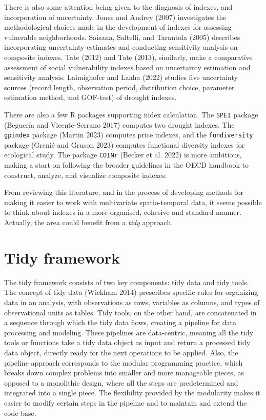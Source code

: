 \documentclass[
]{interact}
\begin{document}
There is also some attention being given to the diagnosis of indexes,
and incorporation of uncertainty. Jones and Andrey (2007) investigates
the methodological choices made in the development of indexes for
assessing vulnerable neighborhoods. Saisana, Saltelli, and Tarantola
(2005) describes incorporating uncertainty estimates and conducting
sensitivity analysis on composite indexes. Tate (2012) and Tate (2013),
similarly, make a comparative assessment of social vulnerability indexes
based on uncertainty estimation and sensitivity analysis. Laimighofer
and Laaha (2022) studies five uncertainty sources (record length,
observation period, distribution choice, parameter estimation method,
and GOF-test) of drought indexes.

There are also a few R packages supporting index calculation. The
\texttt{SPEI} package (Beguería and Vicente-Serrano 2017) computes two
drought indexes. The \texttt{gpindex} package (Martin 2023) computes
price indexes, and the \texttt{fundiversity} package (Grenié and Gruson
2023) computes functional diversity indexes for ecological study. The
package \texttt{COINr} (Becker et al. 2022) is more ambitious, making a
start on following the broader guidelines in the OECD handbook to
construct, analyze, and visualize composite indexes.

From reviewing this literature, and in the process of developing methods
for making it easier to work with multivariate spatio-temporal data, it
seems possible to think about indexes in a more organised, cohesive and
standard manner. Actually, the area could benefit from a \emph{tidy}
approach.

\section{Tidy framework}\label{sec-tidy}

The tidy framework consists of two key components: tidy data and tidy
tools. The concept of tidy data (Wickham 2014) prescribes specific rules
for organizing data in an analysis, with observations as rows, variables
as columns, and types of observational units as tables. Tidy tools, on
the other hand, are concatenated in a sequence through which the tidy
data flows, creating a pipeline for data processing and modeling. These
pipelines are data-centric, meaning all the tidy tools or functions take
a tidy data object as input and return a processed tidy data object,
directly ready for the next operations to be applied. Also, the pipeline
approach corresponds to the modular programming practice, which breaks
down complex problems into smaller and more manageable pieces, as
opposed to a monolithic design, where all the steps are predetermined
and integrated into a single piece. The flexibility provided by the
modularity makes it easier to modify certain steps in the pipeline and
to maintain and extend the code base.
\end{document}
